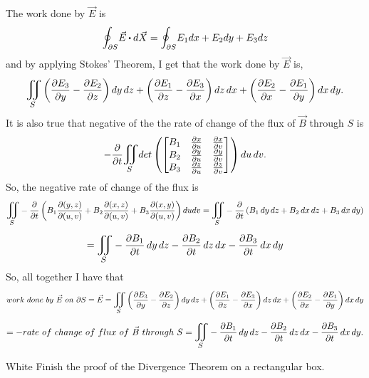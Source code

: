 \documentclass[titlepage]{article}
\begin{document}
\begin{solution}
The work done by $\vec{E}$ is 
$$ \mathlarger\oint_{\p S} \vec{E} \bigcdot d\vec{X} = \mathlarger\oint_{\p S} E_1dx + E_2dy +E_3dz$$
 and by applying Stokes' Theorem, I get that the work done by $\vec{E}$ is,
$$\bigiint{S}{} \left(\frac{\p E_3}{\p y} - \frac{\p E_2}{\p z}\right)dy\,dz + \left(\frac{\p E_1}{\p z} - \frac{\p E_3}{\p x}\right)dz\,dx + \left(\frac{\p E_2}{\p x}-\frac{\p E_1}{\p y}\right)dx\,dy.$$
It is also true that negative of the the rate of change of the flux of $\vec{B}$ through $S$ is
$$-\frac{\p}{\p t} \bigiint{S}{}  det\left(\bmat{B_1 & \frac{\p x}{\p u} & \frac{\p x }{\p v} \\ B_2 & \frac{\p y}{\p u} & \frac{\p y}{\p v} \\ B_3 & \frac{\p z}{\p u} & \frac{\p z}{\p v}} \right)du\,dv.$$
So, the negative rate of change of the flux is  
$$\bigiint{S}{} -\frac{\p }{\p t} \left(B_1\frac{\p(y,z)}{\p(u,v)} + B_2\frac{\p(x,z)}{\p(u,v)} + B_3\frac{\p(x,y)}{\p(u,v)}\right)dudv = \bigiint{S}{}- \frac{\p }{\p t}\left(B_1\,dy\,dz + B_2\, dx\,dz + B_3 \,dx\,dy\right)$$
$$= \bigiint{S}{} -\frac{\p B_1}{\p t} \,dy\,dz -\frac{\p B_2}{\p t} \,dz\,dx  -\frac{\p B_3}{\p t} \,dx\,dy $$
So, all together I have that
$$work \ done \ by \ \vec{E} \ on \ \p S = \vec{E} = \bigiint{S}{} \left(\frac{\p E_3}{\p y} - \frac{\p E_2}{\p z}\right)dy\,dz + \left(\frac{\p E_1}{\p z} - \frac{\p E_3}{\p x}\right)dz\,dx + \left(\frac{\p E_2}{\p x}-\frac{\p E_1}{\p y}\right)dx\,dy$$ $$ = - rate \ of \ change \ of \ flux \ of \ \vec{B} \ through \ S =  \bigiint{S}{} -\frac{\p B_1}{\p t} \,dy\,dz -\frac{\p B_2}{\p t} \,dz\,dx  -\frac{\p B_3}{\p t} \,dx\,dy.$$
\end{solution}
\clearpage
\begin{cproblem}{3}{White}
Finish the proof of the Divergence Theorem on a rectangular box.
\end{cproblem}
\end{document}
